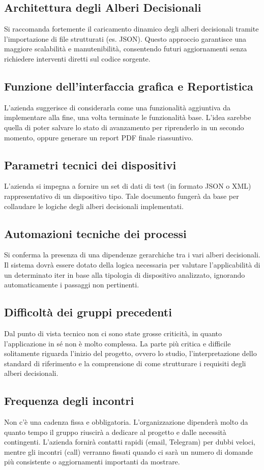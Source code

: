 \documentclass[a4paper,12pt]{article}
\begin{document}
\subsection{Architettura degli Alberi Decisionali}
Si raccomanda fortemente il caricamento dinamico degli alberi decisionali tramite l'importazione di file strutturati (es. JSON). Questo approccio garantisce una maggiore scalabilità e manutenibilità, consentendo futuri aggiornamenti senza richiedere interventi diretti sul codice sorgente.
\subsection{Funzione dell'interfaccia grafica e Reportistica}
L'azienda suggerisce di considerarla come una funzionalità aggiuntiva da implementare alla fine, una volta terminate le funzionalità base. L'idea sarebbe quella di poter salvare lo stato di avanzamento per riprenderlo in un secondo momento, oppure generare un report PDF finale riassuntivo.
\subsection{Parametri tecnici dei dispositivi}
L'azienda si impegna a fornire un set di dati di test (in formato JSON o XML) rappresentativo di un dispositivo tipo. Tale documento fungerà da base per collaudare le logiche degli alberi decisionali implementati.
\subsection{Automazioni tecniche dei processi}
Si conferma la presenza di una dipendenze gerarchiche tra i vari alberi decisionali. Il sistema dovrà essere dotato della logica necessaria per valutare l'applicabilità di un determinato iter in base alla tipologia di dispositivo analizzato, ignorando automaticamente i passaggi non pertinenti.
\subsection{Difficoltà dei gruppi precedenti}
Dal punto di vista tecnico non ci sono state grosse criticità, in quanto l'applicazione in sé non è molto complessa. La parte più critica e difficile solitamente riguarda l'inizio del progetto, ovvero lo studio, l'interpretazione dello standard di riferimento e la comprensione di come strutturare i requisiti degli alberi decisionali.
\subsection{Frequenza degli incontri}
Non c'è una cadenza fissa e obbligatoria. L'organizzazione dipenderà molto da quanto tempo il gruppo riuscirà a dedicare al progetto e dalle necessità contingenti. L'azienda fornirà contatti rapidi (email, Telegram) per dubbi veloci, mentre gli incontri (call) verranno fissati quando ci sarà un numero di domande più consistente o aggiornamenti importanti da mostrare.
\newpage
\end{document}
